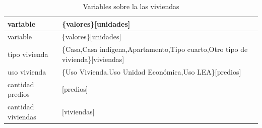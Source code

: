 \documentclass[12pt,a4paper,oneside, openany]{book}
\theoremstyle{definition}
\theoremstyle{definition}
\theoremstyle{definition}
\theoremstyle{remark}
\begin{document}
\begin{longtable}[]{@{}ll@{}}
\caption{\label{tab:vars-vivienda} Variables sobre la las
viviendas}\tabularnewline
\toprule
\begin{minipage}[b]{0.24\columnwidth}\raggedright\strut
variable\strut
\end{minipage} & \begin{minipage}[b]{0.37\columnwidth}\raggedright\strut
\{valores\}{[}unidades{]}\strut
\end{minipage}\tabularnewline
\midrule
\endfirsthead
\toprule
\begin{minipage}[b]{0.24\columnwidth}\raggedright\strut
variable\strut
\end{minipage} & \begin{minipage}[b]{0.37\columnwidth}\raggedright\strut
\{valores\}{[}unidades{]}\strut
\end{minipage}\tabularnewline
\midrule
\endhead
\begin{minipage}[t]{0.24\columnwidth}\raggedright\strut
tipo vivienda\strut
\end{minipage} & \begin{minipage}[t]{0.37\columnwidth}\raggedright\strut
\{Casa,Casa indígena,Apartamento,Tipo cuarto,Otro tipo de
vivienda\}{[}viviendas{]}\strut
\end{minipage}\tabularnewline
\begin{minipage}[t]{0.24\columnwidth}\raggedright\strut
uso vivienda\strut
\end{minipage} & \begin{minipage}[t]{0.37\columnwidth}\raggedright\strut
\{Uso Vivienda.Uso Unidad Económica,Uso LEA\}{[}predios{]}\strut
\end{minipage}\tabularnewline
\begin{minipage}[t]{0.24\columnwidth}\raggedright\strut
cantidad predios\strut
\end{minipage} & \begin{minipage}[t]{0.37\columnwidth}\raggedright\strut
{[}predios{]}\strut
\end{minipage}\tabularnewline
\begin{minipage}[t]{0.24\columnwidth}\raggedright\strut
cantidad viviendas\strut
\end{minipage} & \begin{minipage}[t]{0.37\columnwidth}\raggedright\strut
{[}viviendas{]}\strut
\end{minipage}\tabularnewline
\bottomrule
\end{longtable}
\end{document}
